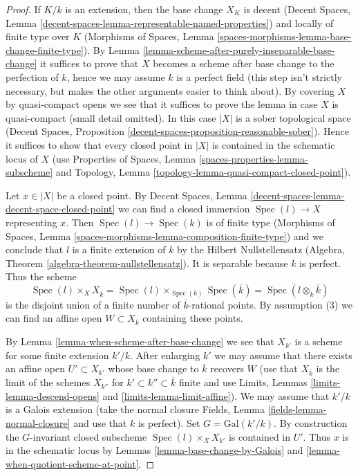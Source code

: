 \documentclass{stacks-project}
\theoremstyle{plain}
\theoremstyle{definition}
\theoremstyle{remark}
\numberwithin{equation}{subsection}
\def\Spec{\mathop{\mathrm{Spec}}}
\begin{document}
\begin{proof}
If $K/k$ is an extension, then the base change $X_K$ is
decent (Decent Spaces, Lemma
\ref{decent-spaces-lemma-representable-named-properties})
and locally of finite type
over $K$ (Morphisms of Spaces, Lemma
\ref{spaces-morphisms-lemma-base-change-finite-type}).
By Lemma \ref{lemma-scheme-after-purely-inseparable-base-change}
it suffices to prove that $X$ becomes a scheme after base change to
the perfection of $k$, hence we may assume $k$ is a perfect field
(this step isn't strictly necessary, but makes the other arguments
easier to think about).
By covering $X$ by quasi-compact opens we see that it suffices to prove
the lemma in case $X$ is quasi-compact (small detail omitted).
In this case $|X|$ is a sober topological space
(Decent Spaces, Proposition
\ref{decent-spaces-proposition-reasonable-sober}).
Hence it suffices to show that every closed point in $|X|$
is contained in the schematic locus of $X$
(use Properties of Spaces, Lemma \ref{spaces-properties-lemma-subscheme} and
Topology, Lemma \ref{topology-lemma-quasi-compact-closed-point}).

\medskip\noindent
Let $x \in |X|$ be a closed point. By Decent Spaces, Lemma
\ref{decent-spaces-lemma-decent-space-closed-point}
we can find a closed immersion $\Spec(l) \to X$ representing $x$.
Then $\Spec(l) \to \Spec(k)$ is of finite type (Morphisms of Spaces,
Lemma \ref{spaces-morphisms-lemma-composition-finite-type}) and we
conclude that $l$ is a finite extension of $k$
by the Hilbert Nullstellensatz (Algebra, Theorem
\ref{algebra-theorem-nullstellensatz}). It is separable because
$k$ is perfect. Thus the scheme
$$
\Spec(l) \times_X X_{\overline{k}} =
\Spec(l) \times_{\Spec(k)} \Spec(\overline{k}) =
\Spec(l \otimes_k \overline{k})
$$
is the disjoint union of a finite number of $\overline{k}$-rational points.
By assumption (3) we can find an affine open $W \subset X_{\overline{k}}$
containing these points.

\medskip\noindent
By Lemma \ref{lemma-when-scheme-after-base-change} we see that $X_{k'}$
is a scheme for some finite extension $k'/k$. After enlarging
$k'$ we may assume that there exists an affine open $U' \subset X_{k'}$
whose base change to $\overline{k}$ recovers $W$
(use that $X_{\overline{k}}$ is the limit of the schemes $X_{k''}$
for $k' \subset k'' \subset \overline{k}$ finite and use
Limits, Lemmas \ref{limits-lemma-descend-opens} and
\ref{limits-lemma-limit-affine}). We may assume
that $k'/k$ is a Galois extension (take the normal closure
Fields, Lemma \ref{fields-lemma-normal-closure} and use
that $k$ is perfect). Set $G = \text{Gal}(k'/k)$.
By construction the $G$-invariant closed subscheme
$\Spec(l) \times_X X_{k'}$ is contained in $U'$.
Thus $x$ is in the schematic locus by
Lemmas \ref{lemma-base-change-by-Galois} and
\ref{lemma-when-quotient-scheme-at-point}.
\end{proof}
\end{document}
